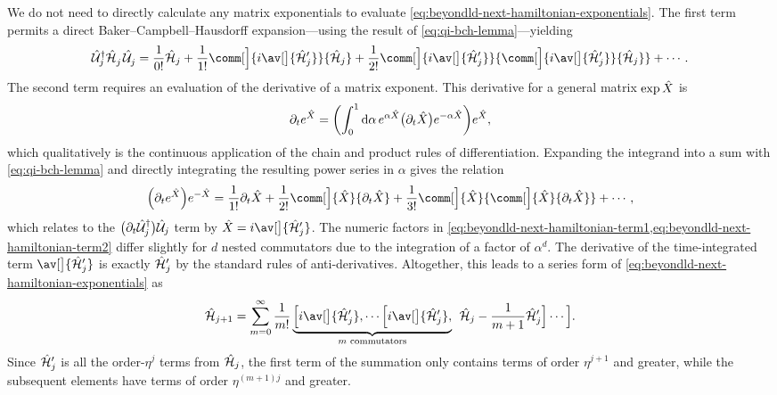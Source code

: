 We do not need to directly calculate any matrix exponentials to evaluate \cref{eq:beyondld-next-hamiltonian-exponentials}.
The first term permits a direct Baker--Campbell--Hausdorff expansion---using the result of \cref{eq:qi-bch-lemma}---yielding
\begin{equation}\label{eq:beyondld-next-hamiltonian-term1}
\U_j^{\smash\dagger} \H_j^{\smash{\vphantom\dagger}}\mkern2mu\U_j^{\smash{\vphantom\dagger}}
    = \frac1{0!}\H_j + \frac1{1!}\comm[\Big]{i\av[\big]{\H_j'}}{\H_j} + \frac1{2!}\comm[\Big]{i\av[\big]{\H_j'}}{\comm[\Big]{i\av[\big]{\H_j'}}{\H_j}} + \dotsb.
\end{equation}
The second term requires an evaluation of the derivative of a matrix exponent.
This derivative for a general matrix $\exp\hat{X}$ is~\cite{Hall2015}
\begin{equation}
\partial_t e^{\hat{X}} = \biggl(\int_0^1\mathrm d\alpha\,e^{\alpha\hat{X}}\bigl(\partial_t \hat{X}\bigr)e^{-\alpha\hat{X}}\biggr)e^{\hat{X}},
\end{equation}
which qualitatively is the continuous application of the chain and product rules of differentiation.
Expanding the integrand into a sum with \cref{eq:qi-bch-lemma} and directly integrating the resulting power series in $\alpha$ gives the relation
\begin{equation}\label{eq:beyondld-next-hamiltonian-term2}
\Bigl(\partial_t e^{\op X}\Bigr)e^{-\op X} = \frac1{1!}\partial_t\op X + \frac1{2!}\comm[\Big]{\op X}{\partial_t\op X} + \frac1{3!}\comm[\Big]{\op X}{\comm[\Big]{\op X}{\partial_t\op X}} + \dotsb,
\end{equation}
which relates to the $\bigl(\partial_t \hat{\mathcal U}_j^\dagger\bigr)\hat{\mathcal U}_j$ term by $\op X = i\av[\big]{\H_j'}$.
The numeric factors in \cref{eq:beyondld-next-hamiltonian-term1,eq:beyondld-next-hamiltonian-term2} differ slightly for $d$ nested commutators due to the integration of a factor of $\alpha^d$.
The derivative of the time-integrated term $\av[\big]{\H_j'}$ is exactly $\hat{\mathcal H}_j'$ by the standard rules of anti-derivatives.
Altogether, this leads to a series form of \cref{eq:beyondld-next-hamiltonian-exponentials} as
\begin{equation}\label{eq:beyondld-next-hamiltonian-sum}
\H_{j+1} = \sum_{m=0}^\infty \frac{1}{m!}
    \underbrace{\Bigl[i \av[\big]{\H_j'}, \dotsb \Bigl[i \av[\big]{\H_j'},}_{\text{$m$ commutators}}\mkern8mu
    \H_j - \frac1{m+1} \H_j' \Bigr] \dotsb \Bigr].
\end{equation}
Since $\hat{\mathcal H}_j'$ is all the order-$\eta^j$ terms from $\hat{\mathcal H}_j$, the first term of the summation only contains terms of order $\eta^{j+1}$ and greater, while the subsequent elements have terms of order $\eta^{(m+1)j}$ and greater.

